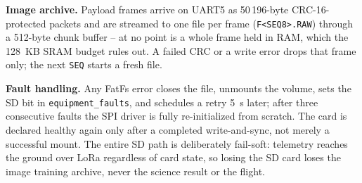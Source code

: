 \textbf{Image archive.} Payload frames arrive on UART5 as 50\,196-byte
CRC-16-protected packets and are streamed to one file per frame
(\texttt{F<SEQ8>.RAW}) through a 512-byte chunk buffer -- at no point is
a whole frame held in RAM, which the 128~KB SRAM budget rules out. A
failed CRC or a write error drops that frame only; the next \texttt{SEQ}
starts a fresh file.

\textbf{Fault handling.} Any FatFs error closes the file, unmounts the
volume, sets the SD bit in \texttt{equipment\_faults}, and schedules a
retry 5~s later; after three consecutive faults the SPI driver is fully
re-initialized from scratch. The card is declared healthy again only
after a completed write-and-sync, not merely a successful mount. The
entire SD path is deliberately fail-soft: telemetry reaches the ground
over LoRa regardless of card state, so losing the SD card loses the image
training archive, never the science result or the flight.
